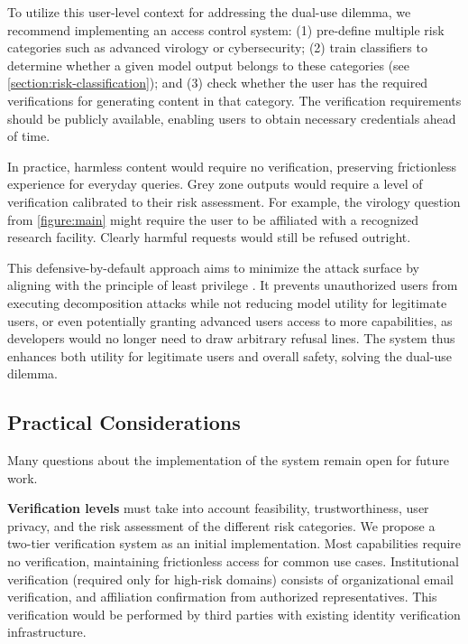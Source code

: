 \documentclass{article}
\theoremstyle{plain}
\theoremstyle{definition}
\theoremstyle{remark}
\begin{document}
To utilize this user-level context for addressing the dual-use
dilemma, we recommend implementing an access control system: (1)
pre-define multiple risk categories such as advanced virology or
cybersecurity; (2) train classifiers to determine whether a given
model output belongs to these categories (see
\cref{section:risk-classification}); and (3) check whether the user
has the required verifications for generating content in that
category. The verification requirements should be publicly available,
enabling users to obtain necessary credentials ahead of time.

In practice, harmless content would require no verification,
preserving frictionless experience for everyday queries. Grey zone
outputs would require a level of verification calibrated to their
risk assessment. For example, the virology question from
\cref{figure:main} might require the user to be affiliated with a
recognized research facility. Clearly harmful requests would still be
refused outright.

This defensive-by-default approach aims to minimize the attack
surface by aligning with the principle of least privilege
\cite{1451869}. It prevents unauthorized users from executing
decomposition attacks while not reducing model utility for legitimate
users, or even potentially granting advanced users access to more
capabilities, as developers would no longer need to draw arbitrary
refusal lines. The system thus enhances both utility for legitimate
users and overall safety, solving the dual-use dilemma.

\subsection{Practical Considerations}
\label{section:access-controls-future-work}

Many questions about the implementation of the system remain open for
future work.

\textbf{Verification levels} must take into account feasibility,
trustworthiness, user privacy, and the risk assessment of the
different risk categories.
We propose a two-tier verification system as an initial
implementation. Most capabilities require no verification,
maintaining frictionless access for common use cases. Institutional
verification (required only for high-risk domains) consists of
organizational email verification, and affiliation confirmation from
authorized representatives. This verification would be performed by
third parties with existing identity verification infrastructure.
\end{document}
